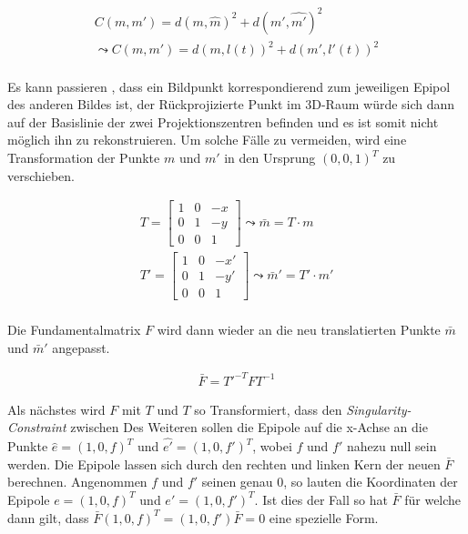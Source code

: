 \begin{gather}
	C(m,m') = d(m,\hat{m})^2 + d(m',\hat{m'})^2\\
	\leadsto 
	C(m,m') = d(m,l(t))^2 + d(m',l'(t))^2
\end{gather}\\

Es kann passieren , dass ein Bildpunkt korrespondierend zum jeweiligen Epipol des anderen Bildes ist, der Rückprojizierte Punkt im 3D-Raum würde sich dann auf der Basislinie der zwei Projektionszentren befinden und es ist somit nicht möglich ihn zu rekonstruieren. Um solche Fälle zu vermeiden, wird eine Transformation der Punkte $m$ und $m'$ in den Ursprung $(0,0,1)^T$ zu verschieben.

\begin{gather}
	T = \begin{bmatrix}
	1&0&-x\\
	0&1&-y\\
	0&0&1
	\end{bmatrix} \leadsto \bar{m} = T\cdot m\\
	T' = \begin{bmatrix}
	1&0&-x'\\
	0&1&-y'\\
	0&0&1
	\end{bmatrix} \leadsto 	\bar{m}' = T' \cdot m'
\end{gather} \\

Die Fundamentalmatrix $F$ wird dann wieder an die neu translatierten Punkte $\bar{m}$ und $\bar{m}'$ angepasst.

\begin{gather}
	\bar{F}= T'^{-T}FT^{-1}
\end{gather}

Als nächstes wird $F$ mit $T$ und $T$ so Transformiert, dass den \textit{Singularity-Constraint} zwischen 
Des Weiteren sollen die Epipole auf die x-Achse an die Punkte $\hat{e}=(1,0,f)^T$ und $\hat{e'}=(1,0,f')^T$, wobei $f$ und $f'$ nahezu null sein werden. Die Epipole lassen sich durch den rechten und linken Kern der neuen $\bar{F}$ berechnen. Angenommen $f$ und $f'$ seinen genau 0, so lauten die Koordinaten der Epipole $e = (1,0,f)^T$ und $e' = (1,0,f')^T$. Ist dies der Fall so hat $\bar{F}$ für welche dann gilt, dass $\bar{F}(1,0,f)^T = (1,0,f')\bar{F}=0$ eine spezielle Form.

